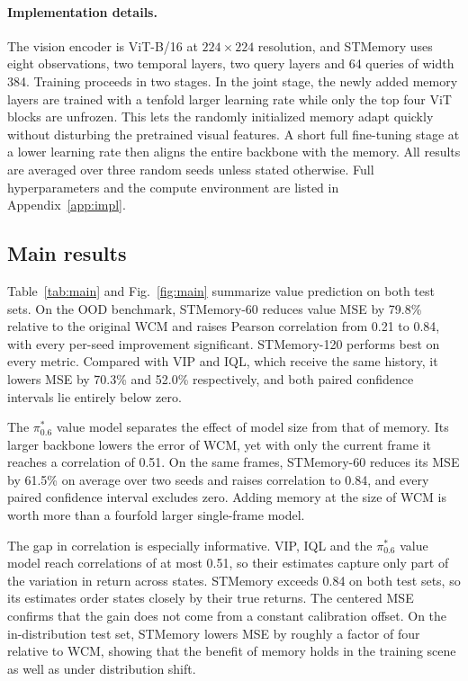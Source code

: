 \documentclass[10pt,a4paper]{article}
\begin{document}
\paragraph{Implementation details.}
The vision encoder is ViT-B/16 at $224\times224$ resolution, and STMemory uses eight observations, two temporal layers, two query layers and 64 queries of width 384. Training proceeds in two stages. In the joint stage, the newly added memory layers are trained with a tenfold larger learning rate while only the top four ViT blocks are unfrozen. This lets the randomly initialized memory adapt quickly without disturbing the pretrained visual features. A short full fine-tuning stage at a lower learning rate then aligns the entire backbone with the memory. All results are averaged over three random seeds unless stated otherwise. Full hyperparameters and the compute environment are listed in Appendix~\ref{app:impl}.

\subsection{Main results}

Table~\ref{tab:main} and Fig.~\ref{fig:main} summarize value prediction on both test sets. On the OOD benchmark, STMemory-60 reduces value MSE by 79.8\% relative to the original WCM and raises Pearson correlation from 0.21 to 0.84, with every per-seed improvement significant. STMemory-120 performs best on every metric. Compared with VIP and IQL, which receive the same history, it lowers MSE by 70.3\% and 52.0\% respectively, and both paired confidence intervals lie entirely below zero.

The $\pi^{*}_{0.6}$ value model separates the effect of model size from that of memory. Its larger backbone lowers the error of WCM, yet with only the current frame it reaches a correlation of 0.51. On the same frames, STMemory-60 reduces its MSE by 61.5\% on average over two seeds and raises correlation to 0.84, and every paired confidence interval excludes zero. Adding memory at the size of WCM is worth more than a fourfold larger single-frame model.

The gap in correlation is especially informative. VIP, IQL and the $\pi^{*}_{0.6}$ value model reach correlations of at most 0.51, so their estimates capture only part of the variation in return across states. STMemory exceeds 0.84 on both test sets, so its estimates order states closely by their true returns. The centered MSE confirms that the gain does not come from a constant calibration offset. On the in-distribution test set, STMemory lowers MSE by roughly a factor of four relative to WCM, showing that the benefit of memory holds in the training scene as well as under distribution shift.
\end{document}
